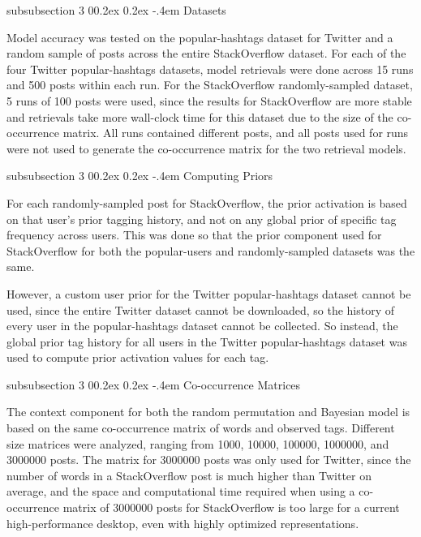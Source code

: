 \documentclass[man,donotrepeattitle]{apa6}
\makeatletter
\renewcommand{\subsubsection}{%
  \@startsection
  {subsubsection}%
  {3}%
  {\parindent}%
  {0\baselineskip \@plus 0.2ex \@minus 0.2ex}%
  {-.4em}%
  {\normalfont\normalsize\bfseries\addperi}}
\makeatother
\begin{document}
\subsubsection{Datasets}

Model accuracy was tested on the popular-hashtags dataset for Twitter and a random sample of posts across the entire StackOverflow dataset.
For each of the four Twitter popular-hashtags datasets, model retrievals were done across 15 runs and 500 posts within each run.
For the StackOverflow randomly-sampled dataset, 5 runs of 100 posts were used,
since the results for StackOverflow are more stable and retrievals take more wall-clock time for this dataset due to the size of the co-occurrence matrix.
All runs contained different posts, and all posts used for runs were not used to generate the co-occurrence matrix for the two retrieval models.

\subsubsection{Computing Priors}

For each randomly-sampled post for StackOverflow, the prior activation is based on that user's prior tagging history, and not on any global prior of specific tag frequency across users.
This was done so that the prior component used for StackOverflow for both the popular-users and randomly-sampled datasets was the same.

However, a custom user prior for the Twitter popular-hashtags dataset cannot be used, since the entire Twitter dataset cannot be downloaded, so the history of every user in the popular-hashtags dataset cannot be collected.
So instead, the global prior tag history for all users in the Twitter popular-hashtags dataset was used to compute prior activation values for each tag.

\subsubsection{Co-occurrence Matrices}

The context component for both the random permutation and Bayesian model is based on the same co-occurrence matrix of words and observed tags.
Different size matrices were analyzed, ranging from \num{1000}, \num{10000}, \num{100000}, \num{1000000}, and \num{3000000} posts.
The matrix for \num{3000000} posts was only used for Twitter, since the number of words in a StackOverflow post is much higher than Twitter on average,
and the space and computational time required when using a co-occurrence matrix of \num{3000000} posts for StackOverflow is too large for a current high-performance desktop, even with highly optimized representations.
\end{document}

